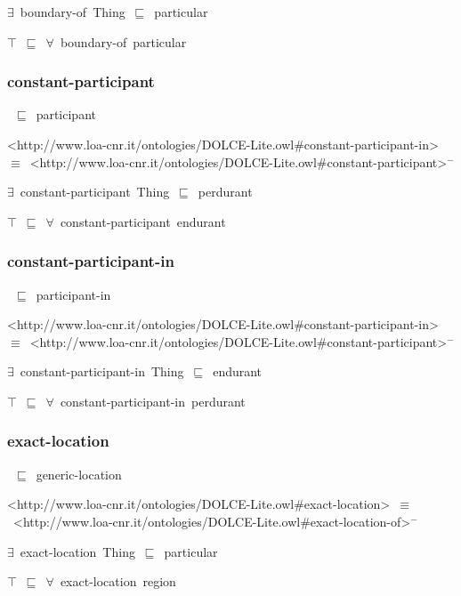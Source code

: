 \documentclass{article}
\begin{document}
\ensuremath{\exists}~boundary-of~Thing~\ensuremath{\sqsubseteq}~particular

\ensuremath{\top}~\ensuremath{\sqsubseteq}~\ensuremath{\forall}~boundary-of~particular

\subsubsection*{constant-participant}

~\ensuremath{\sqsubseteq}~participant

<http://www.loa-cnr.it/ontologies/DOLCE-Lite.owl#constant-participant-in>~\ensuremath{\equiv}~<http://www.loa-cnr.it/ontologies/DOLCE-Lite.owl#constant-participant>\ensuremath{^-}

\ensuremath{\exists}~constant-participant~Thing~\ensuremath{\sqsubseteq}~perdurant

\ensuremath{\top}~\ensuremath{\sqsubseteq}~\ensuremath{\forall}~constant-participant~endurant

\subsubsection*{constant-participant-in}

~\ensuremath{\sqsubseteq}~participant-in

<http://www.loa-cnr.it/ontologies/DOLCE-Lite.owl#constant-participant-in>~\ensuremath{\equiv}~<http://www.loa-cnr.it/ontologies/DOLCE-Lite.owl#constant-participant>\ensuremath{^-}

\ensuremath{\exists}~constant-participant-in~Thing~\ensuremath{\sqsubseteq}~endurant

\ensuremath{\top}~\ensuremath{\sqsubseteq}~\ensuremath{\forall}~constant-participant-in~perdurant

\subsubsection*{exact-location}

~\ensuremath{\sqsubseteq}~generic-location

<http://www.loa-cnr.it/ontologies/DOLCE-Lite.owl#exact-location>~\ensuremath{\equiv}~<http://www.loa-cnr.it/ontologies/DOLCE-Lite.owl#exact-location-of>\ensuremath{^-}

\ensuremath{\exists}~exact-location~Thing~\ensuremath{\sqsubseteq}~particular

\ensuremath{\top}~\ensuremath{\sqsubseteq}~\ensuremath{\forall}~exact-location~region
\end{document}
